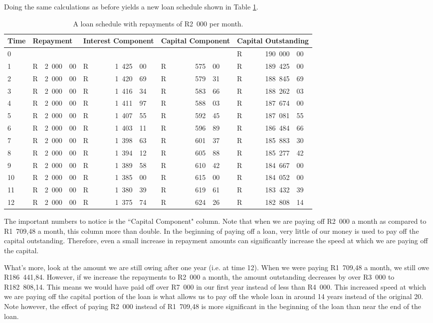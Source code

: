Doing the same calculations as before yields a new loan schedule shown in Table \ref{tb:lschedule2}.

\begin{table}
\begin{center}
\begin{tabular}{|l|lr@{,}l|lr@{,}l|lr@{,}l|lr@{,}l|}
\hline
Time&\multicolumn{3}{l|}{Repayment}&\multicolumn{3}{p{2cm}|}{Interest Component}&\multicolumn{3}{p{2cm}|}{Capital Component}&\multicolumn{3}{p{2.5cm}|}{Capital Outstanding}\\
\hline
\hline
0&\multicolumn{3}{l|}{}&\multicolumn{3}{r|}{}&\multicolumn{3}{r|}{}&R&190~000&00\\
1&R&2~000&00&R&1~425&00&R&575&00&R&189~425&00\\
2&R&2~000&00&R&1~420&69&R&579&31&R&188~845&69\\
3&R&2~000&00&R&1~416&34&R&583&66&R&188~262&03\\
4&R&2~000&00&R&1~411&97&R&588&03&R&187~674&00\\
5&R&2~000&00&R&1~407&55&R&592&45&R&187~081&55\\
6&R&2~000&00&R&1~403&11&R&596&89&R&186~484&66\\
7&R&2~000&00&R&1~398&63&R&601&37&R&185~883&30\\
8&R&2~000&00&R&1~394&12&R&605&88&R&185~277&42\\
9&R&2~000&00&R&1~389&58&R&610&42&R&184~667&00\\
10&R&2~000&00&R&1~385&00&R&615&00&R&184~052&00\\
11&R&2~000&00&R&1~380&39&R&619&61&R&183~432&39\\
12&R&2~000&00&R&1~375&74&R&624&26&R&182~808&14\\
\hline
\end{tabular}
\end{center}
\caption{A loan schedule with repayments of R2~000 per month.}
\label{tb:lschedule2}
\end{table}

The important numbers to notice is the ``Capital Component" column. Note that when we are paying off R2~000 a month as compared to R1~709,48 a month, this column more than double. In the beginning of paying off a loan, very little of our money is used to pay off the capital outstanding. Therefore, even a small increase in repayment amounts can significantly increase the speed at which we are paying off the capital.

What's more, look at the amount we are still owing after one year (i.e. at time 12). When we were paying R1~709,48 a month, we still owe R186~441,84. However, if we increase the repayments to R2~000 a month, the amount outstanding decreases by over R3~000 to R182~808,14. This means we would have paid off over R7~000 in our first year instead of less than R4~000. This increased speed at which we are paying off the capital portion of the loan is what allows us to pay off the whole loan in around 14 years instead of the original 20. Note however, the effect of paying R2~000 instead of R1~709,48 is more significant in the beginning of the loan than near the end of the loan.

